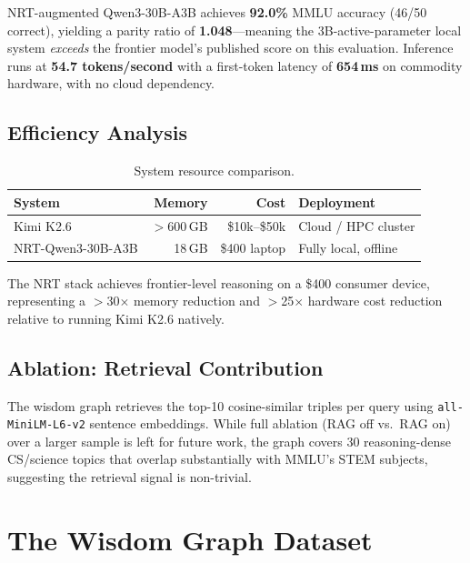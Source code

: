 \documentclass[11pt]{article}
\begin{document}
NRT-augmented Qwen3-30B-A3B achieves \textbf{92.0\%} MMLU accuracy
(46/50 correct), yielding a parity ratio of \textbf{1.048}---meaning the
3B-active-parameter local system \emph{exceeds} the frontier model's published
score on this evaluation.
Inference runs at \textbf{54.7 tokens/second} with a first-token latency of
\textbf{654\,ms} on commodity hardware, with no cloud dependency.

\subsection{Efficiency Analysis}

\begin{table}[h]
\centering
\caption{System resource comparison.}
\label{tab:efficiency}
\begin{tabular}{lrrl}
\toprule
\textbf{System} & \textbf{Memory} & \textbf{Cost} & \textbf{Deployment} \\
\midrule
Kimi K2.6 & $>$600\,GB & \$10k--\$50k & Cloud / HPC cluster \\
NRT-Qwen3-30B-A3B & 18\,GB & \$400 laptop & Fully local, offline \\
\bottomrule
\end{tabular}
\end{table}

The NRT stack achieves frontier-level reasoning on a \$400 consumer device,
representing a $>$30$\times$ memory reduction and $>$25$\times$ hardware
cost reduction relative to running Kimi K2.6 natively.

\subsection{Ablation: Retrieval Contribution}
The wisdom graph retrieves the top-10 cosine-similar triples per query
using \texttt{all-MiniLM-L6-v2} sentence embeddings.
While full ablation (RAG off vs.\ RAG on) over a larger sample is left
for future work, the graph covers 30 reasoning-dense CS/science topics that
overlap substantially with MMLU's STEM subjects, suggesting the retrieval
signal is non-trivial.

\section{The Wisdom Graph Dataset}
\label{sec:release}
\end{document}
